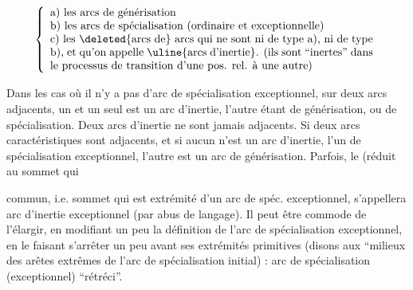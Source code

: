 \[\left\{\begin{array}{p{0.84\linewidth}}
a) les arcs de générisation \\
b) les arcs de spécialisation (ordinaire et exceptionnelle) \\
c) les \deleted{arcs de} arcs qui ne sont ni de type a), ni de type b), et qu'on appelle \uline{arcs d'inertie}. (ils sont ``inertes'' dans le processus de transition d'une pos. rel. à une autre)
\end{array}\right.\]


Dans les cas où il n'y a pas d'arc de spécialisation exceptionnel, sur deux arcs  adjacents,  un et un seul est un arc d'inertie, l'autre étant de générisation, ou de spécialisation. Deux arcs d'inertie ne sont jamais adjacents. Si deux arcs caractéristiques sont adjacents,  et si aucun n'est un arc d'inertie,  l'un  de spécialisation exceptionnel, l'autre est un arc de générisation. Parfois, le   (réduit au sommet qui

commun, i.e.  sommet qui est extrémité d'un arc de spéc. exceptionnel, s'appellera arc d'inertie exceptionnel (par abus de langage). Il peut être commode de l'élargir, en modifiant un peu la définition de l'arc de spécialisation exceptionnel, en le faisant s'arrêter un peu avant ses extrémités primitives (disons aux ``milieux des  arêtes  extrêmes  de l'arc de spécialisation initial) : arc de spécialisation (exceptionnel) ``rétréci''.

